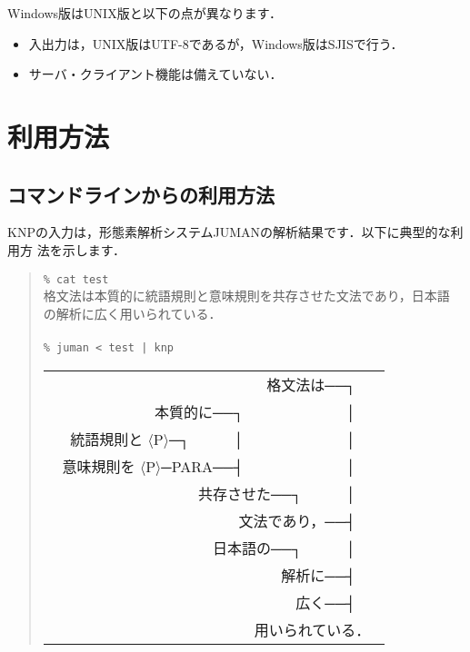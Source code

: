 \documentclass[a4j,11pt,titlepage]{jarticle}
\def\fl{$\langle$}
\def\fr{$\rangle$}
\begin{document}
\vspace*{3ex}

Windows版はUNIX版と以下の点が異なります．
\begin{itemize}
 \item 入出力は，UNIX版はUTF-8であるが，Windows版はSJISで行う．
 \item サーバ・クライアント機能は備えていない．
\end{itemize}


\section{利用方法}

\subsection{コマンドラインからの利用方法}

KNPの入力は，形態素解析システムJUMANの解析結果です．以下に典型的な利用方
法を示します．

\begin{quote}
\texttt{\% cat test} \\
格文法は本質的に統語規則と意味規則を共存させた文法であり，日本語 \\
の解析に広く用いられている．\\
 \\
\texttt{\% juman < test | knp} \\
\begin{tabular}[t]{r}
　　　　　　　　　　　　　　格文法は──┐　\ \\[-4pt]
　　　　　　本質的に──┐　　　　　　　│　\ \\[-4pt]
統語規則と \fl P\fr ─┐　　　│　　　　　　　│　\ \\[-4pt]
意味規則を \fl P\fr ─PARA──┤　　　　　　　│　\ \\[-4pt]
　　　　　　　　　共存させた──┐　　　│　\ \\[-4pt]
　　　　　　　　　　　　文法であり，──┤　\ \\[-4pt]
　　　　　　　　　　日本語の──┐　　　│　\ \\[-4pt]
　　　　　　　　　　　　　　　解析に──┤　\ \\[-4pt]
　　　　　　　　　　　　　　　　広く──┤　\ \\[-4pt]
　　　　　　　　　　　　　　用いられている．\ \\
\end{tabular}
\end{quote}
\end{document}
